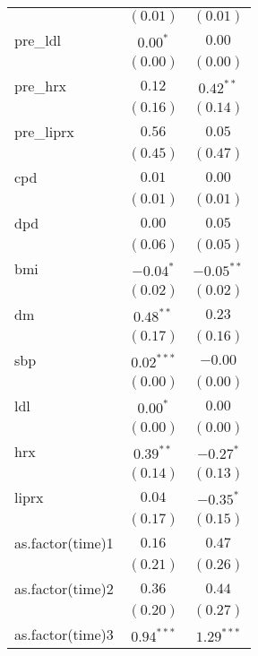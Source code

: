 \begin{tabular}{l c c}
                 & $(0.01)$      & $(0.01)$       \\
pre\_ldl         & $0.00^{*}$    & $0.00$         \\
                 & $(0.00)$      & $(0.00)$       \\
pre\_hrx         & $0.12$        & $0.42^{**}$    \\
                 & $(0.16)$      & $(0.14)$       \\
pre\_liprx       & $0.56$        & $0.05$         \\
                 & $(0.45)$      & $(0.47)$       \\
cpd              & $0.01$        & $0.00$         \\
                 & $(0.01)$      & $(0.01)$       \\
dpd              & $0.00$        & $0.05$         \\
                 & $(0.06)$      & $(0.05)$       \\
bmi              & $-0.04^{*}$   & $-0.05^{**}$   \\
                 & $(0.02)$      & $(0.02)$       \\
dm               & $0.48^{**}$   & $0.23$         \\
                 & $(0.17)$      & $(0.16)$       \\
sbp              & $0.02^{***}$  & $-0.00$        \\
                 & $(0.00)$      & $(0.00)$       \\
ldl              & $0.00^{*}$    & $0.00$         \\
                 & $(0.00)$      & $(0.00)$       \\
hrx              & $0.39^{**}$   & $-0.27^{*}$    \\
                 & $(0.14)$      & $(0.13)$       \\
liprx            & $0.04$        & $-0.35^{*}$    \\
                 & $(0.17)$      & $(0.15)$       \\
as.factor(time)1 & $0.16$        & $0.47$         \\
                 & $(0.21)$      & $(0.26)$       \\
as.factor(time)2 & $0.36$        & $0.44$         \\
                 & $(0.20)$      & $(0.27)$       \\
as.factor(time)3 & $0.94^{***}$  & $1.29^{***}$   \\

\end{tabular}

